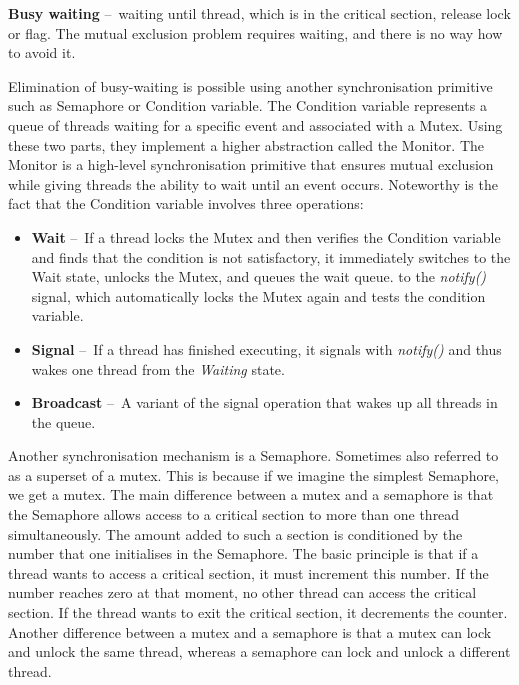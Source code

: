 \begin{definition}
    \textbf{Busy waiting} \---\ waiting until thread, which is in the critical section, release lock or flag. The mutual exclusion problem requires waiting, and there is no way how to avoid it.
\end{definition}
Elimination of busy-waiting is possible using another synchronisation primitive such as Semaphore or Condition variable. The Condition variable represents a queue of threads waiting for a specific event and associated with a Mutex. Using these two parts, they implement a higher abstraction called the Monitor. The Monitor is a high-level synchronisation primitive that ensures mutual exclusion while giving threads the ability to wait until an event occurs. Noteworthy is the fact that the Condition variable involves three operations:
\begin{itemize}[itemsep=1mm, parsep=0pt]
    \item \textbf {Wait} \---\ If a thread locks the Mutex and then verifies the Condition variable and finds that the condition is not satisfactory, it immediately switches to the Wait state, unlocks the Mutex, and queues the wait queue. to the \emph{notify()} signal, which automatically locks the Mutex again and tests the condition variable.
    \item \textbf{Signal} \---\ If a thread has finished executing, it signals with \emph{notify()} and thus wakes one thread from the \emph{Waiting} state.
    \item \textbf{Broadcast} \---\ A variant of the signal operation that wakes up all threads in the queue.
\end{itemize}
Another synchronisation mechanism is a Semaphore. Sometimes also referred to as a superset of a mutex. This is because if we imagine the simplest Semaphore, we get a mutex. The main difference between a mutex and a semaphore is that the Semaphore allows access to a critical section to more than one thread simultaneously. The amount added to such a section is conditioned by the number that one initialises in the Semaphore. The basic principle is that if a thread wants to access a critical section, it must increment this number. If the number reaches zero at that moment, no other thread can access the critical section. If the thread wants to exit the critical section, it decrements the counter. Another difference between a mutex and a semaphore is that a mutex can lock and unlock the same thread, whereas a semaphore can lock and unlock a different thread.


